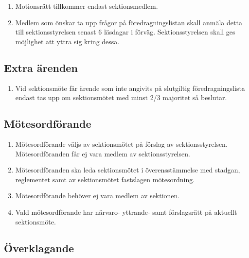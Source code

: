 \documentclass[11pt,a4paper]{article}
\begin{document}
\begin{enumerate}[\thesubsection .1]

  \item Motionsrätt tillkommer endast sektionsmedlem.

  \item Medlem som önskar ta upp frågor på föredragningslistan skall
  anmäla detta till sektionsstyrelsen senast 6 läsdagar i förväg. Sektionsstyrelsen skall ges möjlighet att yttra sig kring dessa.
    
\end{enumerate}

\subsection{Extra ärenden}

\begin{enumerate}[\thesubsection .1]

  \item Vid sektionsmöte får ärende som inte angivits på slutgiltig
  före\-drag\-nings\-lista endast tas upp om sektionsmötet med minst 2/3 majoritet så beslutar.

\end{enumerate}

\subsection{Mötesordförande}

\begin{enumerate}[\thesubsection .1]

  \item Mötes\-ord\-förande väljs av sektionsmötet på förslag av
   sektionsstyrelsen. Mötes\-ord\-föranden får ej vara medlem av sektionsstyrelsen.

  \item Mötesordföranden ska leda sektionsmötet i överensstämmelse med
  st\-ad\-gan, reglementet samt av sektionsmötet fastslagen mötesordning.

\item Mötesordförande behöver ej vara medlem av sektionen.

\item Vald mötesordförande har närvaro- yttrande- samt förslagsrätt på aktuellt sektionsmöte.

\end{enumerate}

\subsection{Överklagande}
\end{document}
